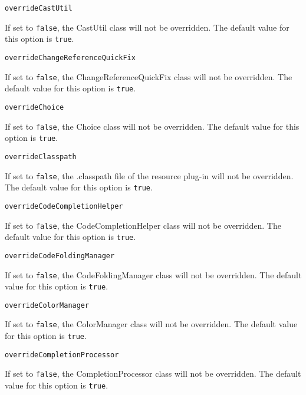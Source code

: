 \noindent\texttt{overrideCastUtil}
\begin{myindentpar}{1cm}
If set to \texttt{false}, the CastUtil class will not be overridden. The default value for this option is \texttt{true}.
\end{myindentpar}

\noindent\texttt{overrideChangeReferenceQuickFix}
\begin{myindentpar}{1cm}
If set to \texttt{false}, the ChangeReferenceQuickFix class will not be overridden. The default value for this option is \texttt{true}.
\end{myindentpar}

\noindent\texttt{overrideChoice}
\begin{myindentpar}{1cm}
If set to \texttt{false}, the Choice class will not be overridden. The default value for this option is \texttt{true}.
\end{myindentpar}

\noindent\texttt{overrideClasspath}
\begin{myindentpar}{1cm}
If set to \texttt{false}, the .classpath file of the resource plug-in will not be overridden. The default value for this option is \texttt{true}.
\end{myindentpar}

\noindent\texttt{overrideCodeCompletionHelper}
\begin{myindentpar}{1cm}
If set to \texttt{false}, the CodeCompletionHelper class will not be overridden. The default value for this option is \texttt{true}.
\end{myindentpar}

\noindent\texttt{overrideCodeFoldingManager}
\begin{myindentpar}{1cm}
If set to \texttt{false}, the CodeFoldingManager class will not be overridden. The default value for this option is \texttt{true}.
\end{myindentpar}

\noindent\texttt{overrideColorManager}
\begin{myindentpar}{1cm}
If set to \texttt{false}, the ColorManager class will not be overridden. The default value for this option is \texttt{true}.
\end{myindentpar}

\noindent\texttt{overrideCompletionProcessor}
\begin{myindentpar}{1cm}
If set to \texttt{false}, the CompletionProcessor class will not be overridden. The default value for this option is \texttt{true}.
\end{myindentpar}


